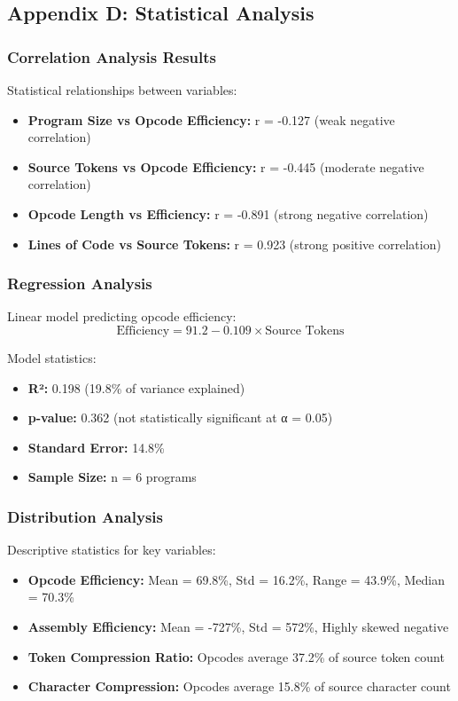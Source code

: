 \documentclass[11pt,a4paper]{article}
\begin{document}
\subsection{Appendix D: Statistical Analysis}

\subsubsection{Correlation Analysis Results}
Statistical relationships between variables:
\begin{itemize}
    \item \textbf{Program Size vs Opcode Efficiency:} r = -0.127 (weak negative correlation)
    \item \textbf{Source Tokens vs Opcode Efficiency:} r = -0.445 (moderate negative correlation)  
    \item \textbf{Opcode Length vs Efficiency:} r = -0.891 (strong negative correlation)
    \item \textbf{Lines of Code vs Source Tokens:} r = 0.923 (strong positive correlation)
\end{itemize}

\subsubsection{Regression Analysis}
Linear model predicting opcode efficiency:
\begin{equation}
\text{Efficiency} = 91.2 - 0.109 \times \text{Source Tokens}
\end{equation}

Model statistics:
\begin{itemize}
    \item \textbf{R²:} 0.198 (19.8\% of variance explained)
    \item \textbf{p-value:} 0.362 (not statistically significant at α = 0.05)
    \item \textbf{Standard Error:} 14.8\%
    \item \textbf{Sample Size:} n = 6 programs
\end{itemize}

\subsubsection{Distribution Analysis}
Descriptive statistics for key variables:
\begin{itemize}
    \item \textbf{Opcode Efficiency:} Mean = 69.8\%, Std = 16.2\%, Range = 43.9\%, Median = 70.3\%
    \item \textbf{Assembly Efficiency:} Mean = -727\%, Std = 572\%, Highly skewed negative
    \item \textbf{Token Compression Ratio:} Opcodes average 37.2\% of source token count
    \item \textbf{Character Compression:} Opcodes average 15.8\% of source character count
\end{itemize}
\end{document}

